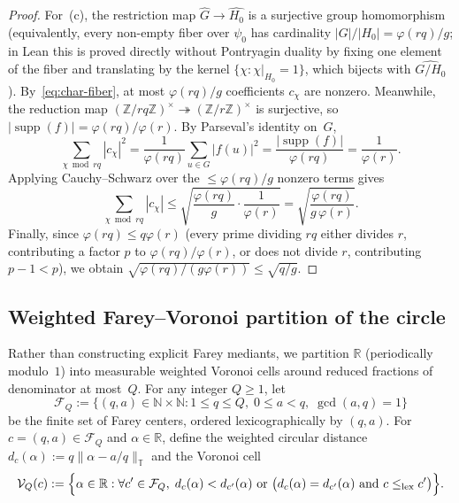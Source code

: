 \documentclass[11pt,reqno]{amsart}
\numberwithin{equation}{section}
\theoremstyle{definition}
\newcommand{\R}{\mathbb{R}}
\newcommand{\Z}{\mathbb{Z}}
\newcommand{\N}{\mathbb{N}}
\newcommand{\T}{\mathbb{T}}
\newcommand{\1}{\mathbf{1}}
\newcommand{\V}{\mathcal{V}}
\DeclareMathOperator{\supp}{supp}
\begin{document}
\begin{proof}
For~(c), the restriction map $\widehat{G} \to \widehat{H_0}$ is a surjective group homomorphism (equivalently, every non-empty fiber over $\psi_0$ has cardinality $|G|/|H_0| = \varphi(rq)/g$; in Lean this is proved directly without Pontryagin duality by fixing one element of the fiber and translating by the kernel $\{\chi : \chi|_{H_0} = 1\}$, which bijects with $\widehat{G/H_0}$). By~\eqref{eq:char-fiber}, at most $\varphi(rq)/g$ coefficients $c_\chi$ are nonzero. Meanwhile, the reduction map $(\Z/rq\Z)^\times \twoheadrightarrow (\Z/r\Z)^\times$ is surjective, so $|\supp(f)| = \varphi(rq)/\varphi(r)$. By Parseval's identity on~$G$,
\[
  \sum_{\chi \bmod rq} |c_\chi|^2 = \frac{1}{\varphi(rq)}\sum_{u \in G} |f(u)|^2 = \frac{|\supp(f)|}{\varphi(rq)} = \frac{1}{\varphi(r)}.
\]
Applying Cauchy--Schwarz over the $\le \varphi(rq)/g$ nonzero terms gives
\[
  \sum_{\chi \bmod rq} |c_\chi|
  \le \sqrt{\frac{\varphi(rq)}{g} \cdot \frac{1}{\varphi(r)}}
  = \sqrt{\frac{\varphi(rq)}{g\,\varphi(r)}}.
\]
Finally, since $\varphi(rq) \le q\varphi(r)$ (every prime dividing $rq$ either divides $r$, contributing a factor $p$ to $\varphi(rq)/\varphi(r)$, or does not divide $r$, contributing $p - 1 < p$), we obtain $\sqrt{\varphi(rq)/(g\varphi(r))} \le \sqrt{q/g}$.
\end{proof}

\subsection{Weighted Farey--Voronoi partition of the circle}

Rather than constructing explicit Farey mediants, we partition $\R$ (periodically modulo~$1$) into measurable weighted Voronoi cells around reduced fractions of denominator at most~$Q$. For any integer $Q \ge 1$, let
\[
  \mathcal{F}_Q := \bigl\{(q, a) \in \N \times \N : 1 \le q \le Q,\; 0 \le a < q,\; \gcd(a, q) = 1\bigr\}
\]
be the finite set of Farey centers, ordered lexicographically by $(q, a)$. For $c = (q, a) \in \mathcal{F}_Q$ and $\alpha \in \R$, define the weighted circular distance $d_c(\alpha) := q \|\alpha - a/q\|_\T$ and the Voronoi cell
\begin{equation}\label{eq:voronoi-cell}
  \V_Q(c) := \Bigl\{\alpha \in \R : \forall c' \in \mathcal{F}_Q,\; d_c(\alpha) < d_{c'}(\alpha) \text{ or } \bigl(d_c(\alpha) = d_{c'}(\alpha) \text{ and } c \le_{\mathrm{lex}} c'\bigr)\Bigr\}.
\end{equation}
\end{document}
